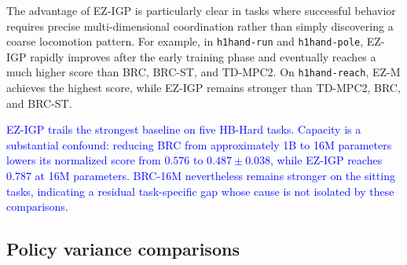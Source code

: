 The advantage of EZ-IGP is particularly clear in tasks where successful behavior requires precise multi-dimensional coordination rather than simply discovering a coarse locomotion pattern. For example, in \texttt{h1hand-run} and \texttt{h1hand-pole}, EZ-IGP rapidly improves after the early training phase and eventually reaches a much higher score than BRC, BRC-ST, and TD-MPC2. On \texttt{h1hand-reach}, EZ-M achieves the highest score, while EZ-IGP remains stronger than TD-MPC2, BRC, and BRC-ST.

\textcolor{blue}{EZ-IGP trails the strongest baseline on five HB-Hard tasks. Capacity is a substantial confound: reducing BRC from approximately 1B to 16M parameters lowers its normalized score from $0.576$ to $0.487\pm0.038$, while EZ-IGP reaches $0.787$ at 16M parameters. BRC-16M nevertheless remains stronger on the sitting tasks, indicating a residual task-specific gap whose cause is not isolated by these comparisons.}

\subsection{Policy variance comparisons}
\label{sec:exp:variance}


